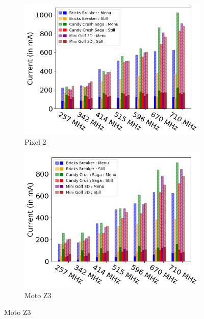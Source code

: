 \begin{figure}[tp]
    \centering
     \begin{subfigure}[b]{0.32\textwidth}
         \centering
         \includegraphics[width=\textwidth]{figures/002_Pixel2_gpu_model.png}
         \caption{Pixel 2}
         \label{fig:number_parameters_vs_duration_100s_0}
     \end{subfigure}
    \begin{subfigure}[b]{0.32\textwidth}
         \centering
         \includegraphics[width=\textwidth]{figures/003_MotoZ3_gpu_model.png}
         \caption{Moto Z3}
         \label{fig:number_parameters_vs_duration_100s_100}
     \end{subfigure}

\end{figure}
